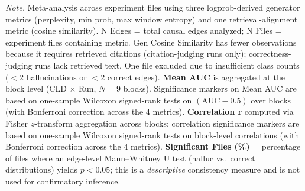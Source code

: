 \begin{table}[H]
\centering
\begin{minipage}{\linewidth}
\centering
\caption{Single UQ Metric Performance for Hallucination Detection (Meta-Analysis)}
\label{tab:rq2_single_metrics}
\begin{threeparttable}
\small
\setlength{\tabcolsep}{4pt}
\begin{tablenotes}
\small
\item \textit{Note.} Meta-analysis across experiment files using three logprob-derived generator metrics (perplexity, min prob, max window entropy) and one retrieval-alignment metric (cosine similarity). N Edges = total causal edges analyzed; N Files = experiment files containing metric. Gen Cosine Similarity has fewer observations because it requires retrieved citations (citation-judging runs only); correctness-judging runs lack retrieved text. One file excluded due to insufficient class counts ($<$2 hallucinations or $<$2 correct edges). \textbf{Mean AUC} is aggregated at the block level (CLD $\times$ Run, $N=9$ blocks). Significance markers on Mean AUC are based on one-sample Wilcoxon signed-rank tests on $(\mathrm{AUC}-0.5)$ over blocks (with Bonferroni correction across the 4 metrics). \textbf{Correlation r} computed via Fisher $z$-transform aggregation across blocks; correlation significance markers are based on one-sample Wilcoxon signed-rank tests on block-level correlations (with Bonferroni correction across the 4 metrics). \textbf{Significant Files (\%)} = percentage of files where an edge-level Mann--Whitney U test (halluc vs.\ correct distributions) yields $p < 0.05$; this is a \textit{descriptive} consistency measure and is not used for confirmatory inference.

\end{tablenotes}
\end{threeparttable}
\end{minipage}
\end{table}
